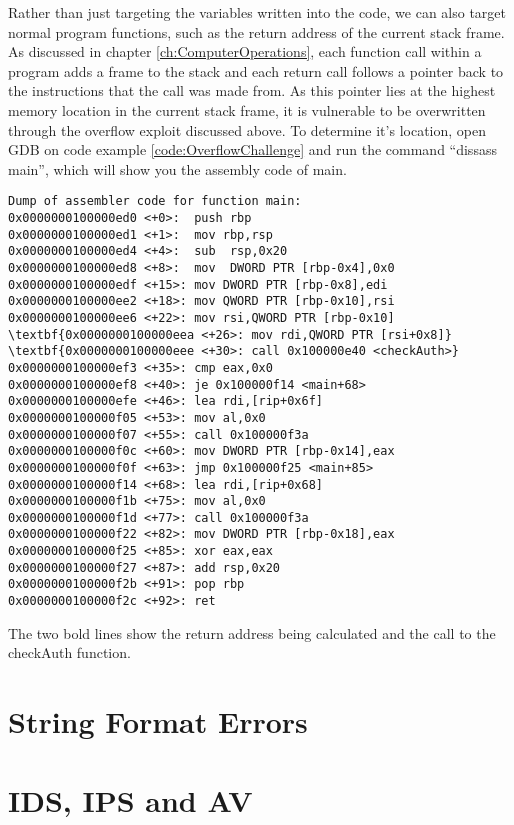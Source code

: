 \documentclass[a4paper,11pt]{report}
\begin{document}
			Rather than just targeting the variables written into the code, we can also target normal program functions,
			such as the return address of the current stack frame. 
			As discussed in chapter \ref{ch:ComputerOperations}, 
			each function call within a program adds a frame to the stack and each return call follows a pointer back to the instructions that the call was made from. 
			As this pointer lies at the highest memory location in the current stack frame, it is vulnerable to be overwritten through the overflow exploit discussed above. 
			To determine it's location, open GDB on code example \ref{code:OverflowChallenge} and run the command ``dissass main'', which will show you the assembly code of main. 
		\begin{Verbatim}[commandchars=\\\{\}]
Dump of assembler code for function main:
0x0000000100000ed0 <+0>:  push rbp
0x0000000100000ed1 <+1>:  mov rbp,rsp
0x0000000100000ed4 <+4>:  sub  rsp,0x20
0x0000000100000ed8 <+8>:  mov  DWORD PTR [rbp-0x4],0x0
0x0000000100000edf <+15>: mov DWORD PTR [rbp-0x8],edi
0x0000000100000ee2 <+18>: mov QWORD PTR [rbp-0x10],rsi
0x0000000100000ee6 <+22>: mov rsi,QWORD PTR [rbp-0x10]
\textbf{0x0000000100000eea <+26>: mov rdi,QWORD PTR [rsi+0x8]}
\textbf{0x0000000100000eee <+30>: call 0x100000e40 <checkAuth>}
0x0000000100000ef3 <+35>: cmp eax,0x0
0x0000000100000ef8 <+40>: je 0x100000f14 <main+68>
0x0000000100000efe <+46>: lea rdi,[rip+0x6f]        
0x0000000100000f05 <+53>: mov al,0x0
0x0000000100000f07 <+55>: call 0x100000f3a
0x0000000100000f0c <+60>: mov DWORD PTR [rbp-0x14],eax
0x0000000100000f0f <+63>: jmp 0x100000f25 <main+85>
0x0000000100000f14 <+68>: lea rdi,[rip+0x68]        
0x0000000100000f1b <+75>: mov al,0x0
0x0000000100000f1d <+77>: call 0x100000f3a
0x0000000100000f22 <+82>: mov DWORD PTR [rbp-0x18],eax
0x0000000100000f25 <+85>: xor eax,eax
0x0000000100000f27 <+87>: add rsp,0x20
0x0000000100000f2b <+91>: pop rbp
0x0000000100000f2c <+92>: ret
		\end{Verbatim}
		The two bold lines show the return address being calculated and the call to the checkAuth function. %

		
	\section{String Format Errors}
	\section{IDS, IPS and AV}
\end{document}
